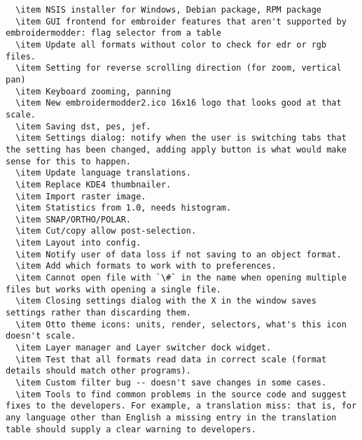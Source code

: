 \begin{verbatim}
  \item NSIS installer for Windows, Debian package, RPM package
  \item GUI frontend for embroider features that aren't supported by embroidermodder: flag selector from a table
  \item Update all formats without color to check for edr or rgb files.
  \item Setting for reverse scrolling direction (for zoom, vertical pan)
  \item Keyboard zooming, panning
  \item New embroidermodder2.ico 16x16 logo that looks good at that scale.
  \item Saving dst, pes, jef.
  \item Settings dialog: notify when the user is switching tabs that the setting has been changed, adding apply button is what would make sense for this to happen.
  \item Update language translations.
  \item Replace KDE4 thumbnailer.
  \item Import raster image.
  \item Statistics from 1.0, needs histogram.
  \item SNAP/ORTHO/POLAR.
  \item Cut/copy allow post-selection.
  \item Layout into config.
  \item Notify user of data loss if not saving to an object format.
  \item Add which formats to work with to preferences.
  \item Cannot open file with `\#` in the name when opening multiple files but works with opening a single file.
  \item Closing settings dialog with the X in the window saves settings rather than discarding them.
  \item Otto theme icons: units, render, selectors, what's this icon doesn't scale.
  \item Layer manager and Layer switcher dock widget.
  \item Test that all formats read data in correct scale (format details should match other programs).
  \item Custom filter bug -- doesn't save changes in some cases.
  \item Tools to find common problems in the source code and suggest fixes to the developers. For example, a translation miss: that is, for any language other than English a missing entry in the translation table should supply a clear warning to developers.

\end{verbatim}
